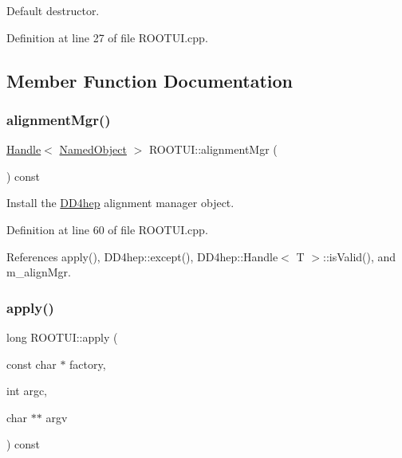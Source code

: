 Default destructor. 



Definition at line 27 of file R\+O\+O\+T\+U\+I.\+cpp.



\subsection{Member Function Documentation}
\hypertarget{class_d_d4hep_1_1_r_o_o_t_u_i_a8a7515c23e2c8129948fb61019dabf36}{}\label{class_d_d4hep_1_1_r_o_o_t_u_i_a8a7515c23e2c8129948fb61019dabf36} 
\subsubsection{\texorpdfstring{alignment\+Mgr()}{alignmentMgr()}}
{\footnotesize\ttfamily \hyperlink{class_d_d4hep_1_1_handle}{Handle}$<$ \hyperlink{class_d_d4hep_1_1_named_object}{Named\+Object} $>$ R\+O\+O\+T\+U\+I\+::alignment\+Mgr (\begin{DoxyParamCaption}{ }\end{DoxyParamCaption}) const}



Install the \hyperlink{namespace_d_d4hep}{D\+D4hep} alignment manager object. 



Definition at line 60 of file R\+O\+O\+T\+U\+I.\+cpp.



References apply(), D\+D4hep\+::except(), D\+D4hep\+::\+Handle$<$ T $>$\+::is\+Valid(), and m\+\_\+align\+Mgr.

\hypertarget{class_d_d4hep_1_1_r_o_o_t_u_i_a5c620abe4a5288a6b654df105604909e}{}\label{class_d_d4hep_1_1_r_o_o_t_u_i_a5c620abe4a5288a6b654df105604909e} 
\subsubsection{\texorpdfstring{apply()}{apply()}}
{\footnotesize\ttfamily long R\+O\+O\+T\+U\+I\+::apply (\begin{DoxyParamCaption}\item[{const char $\ast$}]{factory,  }\item[{int}]{argc,  }\item[{char $\ast$$\ast$}]{argv }\end{DoxyParamCaption}) const\hspace{0.3cm}{\ttfamily [virtual]}}



